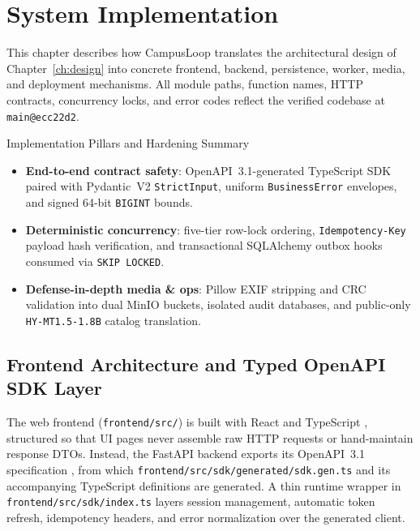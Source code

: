 \chapter{System Implementation}
\label{ch:implementation}

This chapter describes how CampusLoop translates the architectural design of Chapter~\ref{ch:design} into concrete frontend, backend, persistence, worker, media, and deployment mechanisms. All module paths, function names, HTTP contracts, concurrency locks, and error codes reflect the verified codebase at \texttt{main@ecc22d2}.

\begin{clbox}{Implementation Pillars and Hardening Summary}
  \small
  \begin{itemize}[leftmargin=1.2em,itemsep=1pt,topsep=2pt]
    \item \textbf{End-to-end contract safety}: OpenAPI~3.1-generated TypeScript SDK paired with Pydantic~V2 \texttt{StrictInput}, uniform \texttt{BusinessError} envelopes, and signed 64-bit \texttt{BIGINT} bounds.
    \item \textbf{Deterministic concurrency}: five-tier row-lock ordering, \texttt{Idempotency-Key} payload hash verification, and transactional SQLAlchemy outbox hooks consumed via \texttt{SKIP LOCKED}.
    \item \textbf{Defense-in-depth media \& ops}: Pillow EXIF stripping and CRC validation into dual MinIO buckets, isolated audit databases, and public-only \texttt{HY-MT1.5-1.8B} catalog translation.
  \end{itemize}
\end{clbox}

\section{Frontend Architecture and Typed OpenAPI SDK Layer}
\label{sec:impl-frontend}

The web frontend (\texttt{frontend/src/}) is built with React and TypeScript \cite{reactDocs}, structured so that UI pages never assemble raw HTTP requests or hand-maintain response DTOs. Instead, the FastAPI backend exports its OpenAPI~3.1 specification \cite{openapi31}, from which \texttt{frontend/src/sdk/generated/sdk.gen.ts} and its accompanying TypeScript definitions are generated. A thin runtime wrapper in \texttt{frontend/src/sdk/index.ts} layers session management, automatic token refresh, idempotency headers, and error normalization over the generated client.

